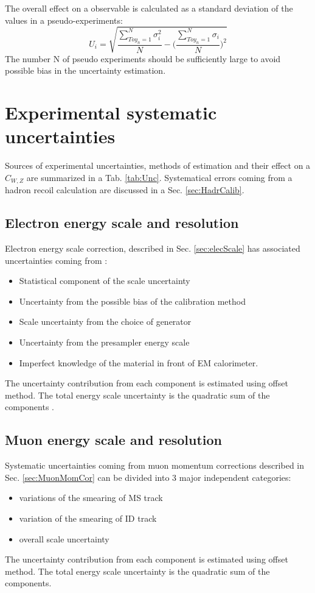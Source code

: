 The overall effect on a observable is calculated as a standard deviation of the values in a pseudo-experiments:
\begin{equation}\label{eq:ToyError}
U_{i}=\sqrt{\frac{\sum_{Toy_n=1}^{N} \sigma^2_{i}} {N} - \Bigg(\frac{\sum_{Toy_n=1}^{N} \sigma_{i}} {N}\Bigg)^2}
\end{equation}
The number N of pseudo experiments should be sufficiently large to avoid possible bias in the uncertainty estimation.
 
\section{Experimental systematic uncertainties}
Sources of experimental uncertainties, methods of estimation and their effect on a $C_{W,Z}$ are summarized in a Tab. \ref{tab:Unc}. Systematical errors coming from a hadron recoil calculation are discussed in a Sec. \ref{sec:HadrCalib}. 
\subsection{Electron energy scale and resolution}
Electron energy scale correction, described in Sec. \ref{sec:elecScale} has associated uncertainties coming from \cite{1110.3174}:
\begin{itemize}
\item Statistical component of the scale uncertainty
\item Uncertainty from the possible bias of the calibration method
\item Scale uncertainty from the choice of generator
\item Uncertainty from the presampler energy scale
\item Imperfect knowledge of the material in front of EM calorimeter.
\end{itemize}
The uncertainty contribution from each component is estimated using offset method. The total energy scale uncertainty is the quadratic sum of the components \cite{ElecUncQuad}. 

\subsection{Muon energy scale and resolution}
Systematic uncertainties coming from muon momentum corrections described in Sec. \ref{sec:MuonMomCor} can be divided into 3 major independent categories:
\begin{itemize}
\item variations of the smearing of MS track
\item variation of the smearing of ID track
\item overall scale uncertainty
\end{itemize}
The uncertainty contribution from each component is estimated using offset method. The total energy scale uncertainty is the quadratic sum of the components.

